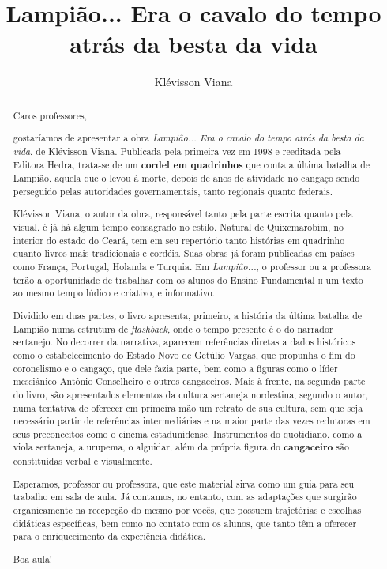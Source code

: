 \documentclass[11pt]{extarticle}
\newcommand{\AutorLivro}{Klévisson Viana}
\newcommand{\TituloLivro}{Lampião... Era o cavalo do tempo atrás da besta da vida}
\newcommand{\colaborador}{Renier Silva}
\begin{document}
\title{\TituloLivro}
\author{\AutorLivro}
\def\authornotes{\colaborador}

\date{}
\maketitle

\tableofcontents


\begin{abstract}

Caros professores, 

gostaríamos de apresentar a obra \textit{Lampião... Era o cavalo do tempo atrás da besta da vida},
de Klévisson Viana. Publicada pela primeira vez em 1998 e reeditada pela Editora Hedra, 
trata-se de um \textbf{cordel em quadrinhos} que conta a última batalha de Lampião, aquela que 
o levou à morte, depois de anos de atividade no cangaço sendo perseguido pelas autoridades governamentais,
tanto regionais quanto federais. 

Klévisson Viana, o autor da obra, responsável tanto pela parte escrita quanto pela visual, 
é já há algum tempo consagrado no estilo. Natural de Quixemarobim, no interior do estado do Ceará,
tem em seu repertório tanto histórias em quadrinho quanto livros mais tradicionais e cordéis. 
Suas obras já foram publicadas em países como França, Portugal, Holanda e Turquia. 
Em \textit{Lampião...}, o professor ou a professora terão a oportunidade de trabalhar com 
os alunos do Ensino Fundamental \textsc{ii} um texto ao mesmo tempo lúdico e criativo, e informativo. 

Dividido em duas partes, o livro apresenta, primeiro, a história da última batalha de Lampião
numa estrutura de \textit{flashback}, onde o tempo presente é o do narrador sertanejo. 
No decorrer da narrativa, aparecem referências diretas a dados históricos como o estabelecimento 
do Estado Novo de Getúlio Vargas, que propunha o fim do coronelismo e o cangaço, que dele fazia parte,
bem como a figuras como o líder messiânico Antônio Conselheiro e outros cangaceiros. 
Mais à frente, na segunda parte do livro, são apresentados elementos da cultura sertaneja nordestina,
segundo o autor, numa tentativa de oferecer em primeira mão um retrato de sua cultura, 
sem que seja necessário partir de referências intermediárias e na maior parte das vezes redutoras
em seus preconceitos como o cinema estadunidense. Instrumentos do quotidiano, como a viola sertaneja,
a urupema, o alguidar, além da própria figura do \textbf{cangaceiro} são constituídas verbal e visualmente. 

Esperamos, professor ou professora, que este material sirva como um guia 
para seu trabalho em sala de aula. Já contamos, no entanto, com as adaptações
que surgirão organicamente na recepeção do mesmo por vocês, que possuem 
trajetórias e escolhas didáticas específicas, bem como no contato com os 
alunos, que tanto têm a oferecer para o enriquecimento da experiência didática.

Boa aula!

\end{abstract}
\end{document}
